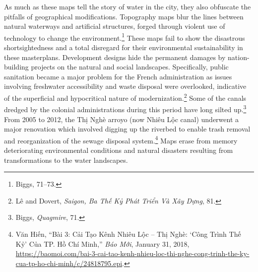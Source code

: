 As much as these maps tell the story of water in the city, they also obfuscate the pitfalls of geographical modifications. Topography maps blur the lines between natural waterways and artificial structures, forged through violent use of technology to change the environment.\footnote{Biggs, 71–73.} These maps fail to show the disastrous shortsightedness and a total disregard for their environmental sustainability in these masterplans. Development designs hide the permanent damages by nation-building projects on the natural and social landscapes. Specifically, public sanitation became a major problem for the French administration as issues involving freshwater accessibility and waste disposal were overlooked, indicative of the superficial and hypocritical nature of modernization.\footnote{Lê and Dovert, \textit{Saigon, Ba Thế Kỷ Phát Triển Và Xây Dựng}, 81.} Some of the canals dredged by the colonial administrations during this period have long silted up.\footnote{Biggs, \textit{Quagmire}, 71.} From 2005 to 2012, the Thị Nghè arroyo (now Nhiêu Lộc canal) underwent a major renovation which involved digging up the riverbed to enable trash removal and reorganization of the sewage disposal system.\footnote{Văn Hiến, “Bài 3: Cải Tạo Kênh Nhiêu Lộc – Thị Nghè: ‘Công Trình Thế Kỷ’ Của TP. Hồ Chí Minh,” \textit{Báo Mới}, January 31, 2018, \url{https://baomoi.com/bai-3-cai-tao-kenh-nhieu-loc-thi-nghe-cong-trinh-the-ky-cua-tp-ho-chi-minh/c/24818795.epi}.} Maps erase from memory deteriorating environmental conditions and natural disasters resulting from transformations to the water landscapes.

